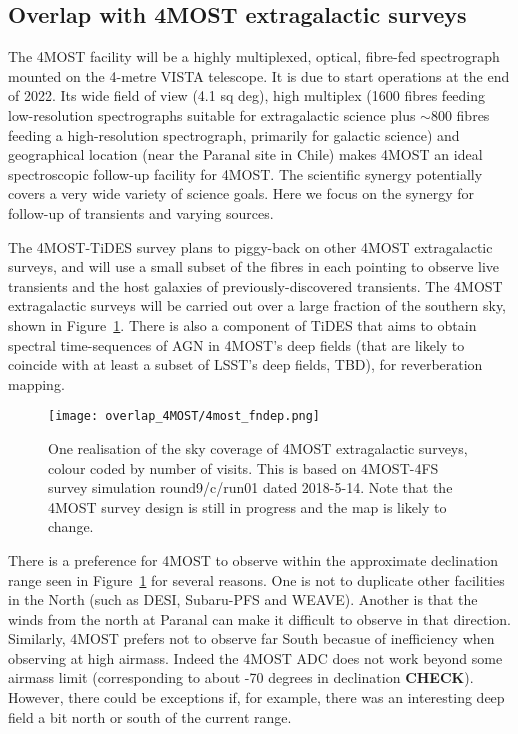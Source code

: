 \subsection{Overlap with 4MOST extragalactic surveys}


The 4MOST facility will be a highly multiplexed, optical, fibre-fed
spectrograph mounted on the 4-metre VISTA telescope. It is due to
start operations at the end of 2022. Its wide field of view (4.1 sq
deg), high multiplex (1600 fibres feeding low-resolution spectrographs
suitable for extragalactic science plus $\sim 800$ fibres feeding a
high-resolution spectrograph, primarily for galactic science) and
geographical location (near the Paranal site in Chile) makes 4MOST an
ideal spectroscopic follow-up facility for 4MOST. The scientific
synergy potentially covers a very wide variety of science goals. Here
we focus on the synergy for follow-up of transients and varying
sources.

The 4MOST-TiDES survey plans to piggy-back on other 4MOST
extragalactic surveys, and will use a small subset of the fibres in
each pointing to observe live transients and the host galaxies of
previously-discovered transients. The 4MOST extragalactic surveys will
be carried out over a large fraction of the southern sky, shown in
Figure~\ref{4most_sky}.  There is also a component of TiDES that aims
to obtain spectral time-sequences of AGN in 4MOST's deep fields (that
are likely to coincide with at least a subset of LSST's deep fields,
TBD), for reverberation mapping.

\begin{figure}[!htbp]
\begin{center}
  \texttt{[image: overlap\_4MOST/4most\_fndep.png]}
\end{center}

\caption{One realisation of the sky coverage of 4MOST extragalactic
  surveys, colour coded by number of visits. This is based on
  4MOST-4FS survey simulation round9/c/run01 dated 2018-5-14. Note
  that the 4MOST survey design is still in progress and the map is
  likely to change.}
\label{4most_sky}
\end{figure}

There is a preference for 4MOST to observe within the approximate
declination range seen in Figure~\ref{4most_sky} for several
reasons. One is not to duplicate other facilities in the North (such
as DESI, Subaru-PFS and WEAVE). Another is that the winds from the
north at Paranal can make it difficult to observe in that
direction. Similarly, 4MOST prefers not to observe far South becasue
of inefficiency when observing at high airmass. Indeed the 4MOST ADC
does not work beyond some airmass limit (corresponding to about -70
degrees in declination {\bf CHECK}). However, there could be
exceptions if, for example, there was an interesting deep field a bit
north or south of the current range.


